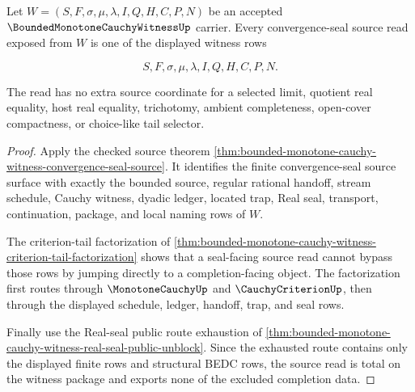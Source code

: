 \begin{theorem}
\label{thm:bounded-monotone-cauchy-witness-convergence-seal-source-totality}
Let $W=(S,F,\sigma,\mu,\lambda,I,Q,H,C,P,N)$ be an accepted $\BoundedMonotoneCauchyWitnessUp$ carrier. Every convergence-seal source read exposed from $W$ is one of the displayed witness rows

$$
S,F,\sigma,\mu,\lambda,I,Q,H,C,P,N.
$$

The read has no extra source coordinate for a selected limit, quotient real equality, host real equality, trichotomy, ambient completeness, open-cover compactness, or choice-like tail selector.
\end{theorem}
\begin{proof}
Apply the checked source theorem \autoref{thm:bounded-monotone-cauchy-witness-convergence-seal-source}. It identifies the finite convergence-seal source surface with exactly the bounded source, regular rational handoff, stream schedule, Cauchy witness, dyadic ledger, located trap, Real seal, transport, continuation, package, and local naming rows of $W$.

The criterion-tail factorization of \autoref{thm:bounded-monotone-cauchy-witness-criterion-tail-factorization} shows that a seal-facing source read cannot bypass those rows by jumping directly to a completion-facing object. The factorization first routes through $\MonotoneCauchyUp$ and $\CauchyCriterionUp$, then through the displayed schedule, ledger, handoff, trap, and seal rows.

Finally use the Real-seal public route exhaustion of \autoref{thm:bounded-monotone-cauchy-witness-real-seal-public-unblock}. Since the exhausted route contains only the displayed finite rows and structural BEDC rows, the source read is total on the witness package and exports none of the excluded completion data.
\end{proof}

